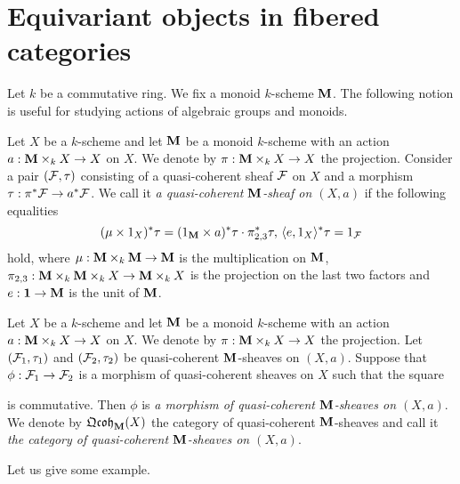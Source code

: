 \section{Equivariant objects in fibered categories}
\noindent
Let $k$ be a commutative ring. We fix a monoid $k$-scheme $\mathbf{M}$. The following notion is useful for studying actions of algebraic groups and monoids.

\begin{definition}
Let $X$ be a $k$-scheme and let $\mathbf{M}$ be a monoid $k$-scheme with an action $a:\mathbf{M}\times_kX\rightarrow X$ on $X$. We denote by $\pi:\mathbf{M}\times_kX\rightarrow X$ the projection. Consider a pair $({\mathcal F},\tau)$ consisting of a quasi-coherent sheaf ${\mathcal F}$ on $X$ and a morphism $\tau:\pi^*{\mathcal F} \rightarrow a^* {\mathcal F}$. We call it \textit{a quasi-coherent $\mathbf{M}$-sheaf on $(X,a)$} if the following equalities
$$(\mu \times 1_X)^*\tau = (1_{\mathbf{M}} \times  a)^*\tau \cdot \pi_{2,3}^*\tau,\,\langle e, 1_{X} \rangle^*\tau = 1_{{\mathcal F}}$$
hold, where $\mu: \mathbf{M} \times_k \mathbf{M} \rightarrow \mathbf{M}$ is the multiplication on $\mathbf{M}$, $\pi_{2,3}:\mathbf{M}\times_k  \mathbf{M} \times_k  X \rightarrow \mathbf{M} \times_k X$ is the projection on the last two factors and $e:\mathbf{1}\rightarrow \mathbf{M}$ is the unit of $\mathbf{M}$.
\end{definition}

\begin{definition}
Let $X$ be a $k$-scheme and let $\mathbf{M}$ be a monoid $k$-scheme with an action $a:\mathbf{M}\times_kX\rightarrow X$ on $X$. We denote by $\pi:\mathbf{M}\times_kX\rightarrow X$ the projection. Let $({\mathcal F}_1,\tau_1)$ and $({\mathcal F}_2,\tau_2)$ be quasi-coherent $\mathbf{M}$-sheaves on $(X,a)$. Suppose that $\phi:{\mathcal F}_1\rightarrow {\mathcal F}_2$ is a morphism of quasi-coherent sheaves on $X$ such that the square
\begin{center}
\end{center}
is commutative. Then $\phi$ is \textit{a morphism of quasi-coherent $\mathbf{M}$-sheaves on $(X,a)$}. We denote by $\mathfrak{Qcoh}_{\mathbf{M}}(X)$ the category of quasi-coherent $\mathbf{M}$-sheaves and call it \textit{the category of quasi-coherent $\mathbf{M}$-sheaves on $(X,a)$}.
\end{definition}
\noindent
Let us give some example.

